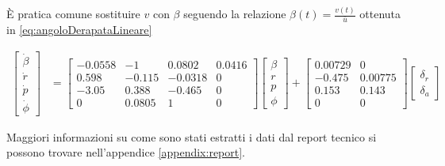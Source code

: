 È pratica comune sostituire $v$ con $\beta$ seguendo la relazione $\beta(t) = \displaystyle\frac{v(t)}{\bar{u}}$ ottenuta in \eqref{eq:angoloDerapataLineare}

\begin{equation}
    \label{eq:motoLaterale}
    \begin{split}
        \begin{bmatrix}
            \dot{\beta} \\
            \dot{r}     \\
            \dot{p}     \\
            \dot{\phi}
        \end{bmatrix} & = \begin{bmatrix}
                              -0.0558 & -1     & 0.0802  & 0.0416 \\
                              0.598   & -0.115 & -0.0318 & 0      \\
                              -3.05   & 0.388  & -0.465  & 0      \\
                              0       & 0.0805 & 1       & 0
                          \end{bmatrix} \begin{bmatrix}
                                            \beta \\
                                            r     \\
                                            p     \\
                                            \phi
                                        \end{bmatrix} + \begin{bmatrix}
                                                            0.00729 & 0       \\
                                                            -0.475  & 0.00775 \\
                                                            0.153   & 0.143   \\
                                                            0       & 0
                                                        \end{bmatrix} \begin{bmatrix}
                                                                          \delta_r \\
                                                                          \delta_a
                                                                      \end{bmatrix}
    \end{split}
\end{equation}

\begin{note}
    Maggiori informazioni su come sono stati estratti i dati dal report tecnico \cite{heffley_handling_qualities} si possono trovare nell'appendice \ref{appendix:report}.
\end{note}
